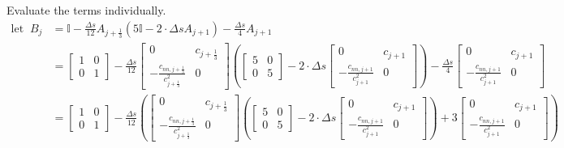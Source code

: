 \documentclass{article}
\begin{document}
Evaluate the terms individually.
\begin{align*}
	\mathrm{let}\;\;B_j                              & =\mathbb{I} - \frac{\Delta s}{12}A_{j+\frac{1}{3}}\left(5\mathbb{I}-2\cdot\Delta sA_{j+1}\right)- \frac{\Delta s}{4}A_{j+1}                                                                                                                                                                                                                                                                                                                                                                                                                                                                                                                                   \\
	                                                 & = \begin{bmatrix} 1 & 0 \\ 0 & 1 \end{bmatrix} - \frac{\Delta s}{12}\begin{bmatrix} 0 & c_{j+\frac{1}{3}} \\ -\frac{c_{nn, j+\frac{1}{3}}}{c_{j+\frac{1}{3}}^2} & 0 \end{bmatrix}\left(\begin{bmatrix} 5 & 0 \\ 0 & 5 \end{bmatrix} -2\cdot\Delta s\begin{bmatrix}  0 & c_{j+1} \\ -\frac{c_{nn, j+1}}{c_{j+1}^2} & 0\end{bmatrix}\right) - \frac{\Delta s}{4}\begin{bmatrix} 0 & c_{j+1} \\ -\frac{c_{nn, j+1}}{c_{j+1}^2} & 0\end{bmatrix}                                                                                      \\
	                                                 & = \begin{bmatrix} 1 & 0 \\ 0 & 1 \end{bmatrix} - \frac{\Delta s}{12}\left(\begin{bmatrix} 0 & c_{j+\frac{1}{3}} \\ -\frac{c_{nn, j+\frac{1}{3}}}{c_{j+\frac{1}{3}}^2} & 0 \end{bmatrix}\left(\begin{bmatrix} 5 & 0 \\ 0 & 5 \end{bmatrix} -2\cdot\Delta s\begin{bmatrix}  0 & c_{j+1} \\ -\frac{c_{nn, j+1}}{c_{j+1}^2} & 0\end{bmatrix}\right) +3\begin{bmatrix} 0 & c_{j+1} \\ -\frac{c_{nn, j+1}}{c_{j+1}^2} & 0\end{bmatrix}\right)                                                                                           \\

\end{align*}
\end{document}
